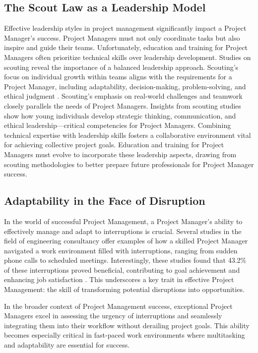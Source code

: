 \documentclass{article}
\begin{document}
\subsection{The Scout Law as a Leadership Model}

Effective leadership styles in project management significantly impact a Project Manager's success. Project Managers must not only coordinate tasks but also inspire and guide their teams. Unfortunately, education and training for Project Managers often prioritize technical skills over leadership development. Studies on scouting reveal the importance of a balanced leadership approach. Scouting's focus on individual growth within teams aligns with the requirements for a Project Manager, including adaptability, decision-making, problem-solving, and ethical judgment \cite{kaluzny2022scouting}. Scouting's emphasis on real-world challenges and teamwork closely parallels the needs of Project Managers. Insights from scouting studies show how young individuals develop strategic thinking, communication, and ethical leadership—critical competencies for Project Managers. Combining technical expertise with leadership skills fosters a collaborative environment vital for achieving collective project goals. Education and training for Project Managers must evolve to incorporate these leadership aspects, drawing from scouting methodologies to better prepare future professionals for Project Manager success.

\subsection{Adaptability in the Face of Disruption}

In the world of successful Project Management, a Project Manager's ability to effectively manage and adapt to interruptions is crucial. Several studies in the field of engineering consultancy offer examples of how a skilled Project Manager navigated a work environment filled with interruptions, ranging from sudden phone calls to scheduled meetings. Interestingly, these studies found that 43.2\% of these interruptions proved beneficial, contributing to goal achievement and enhancing job satisfaction \cite{mordu2016managing}. This underscores a key trait in effective Project Management: the skill of transforming potential disruptions into opportunities.

In the broader context of Project Management success, exceptional Project Managers excel in assessing the urgency of interruptions and seamlessly integrating them into their workflow without derailing project goals. This ability becomes especially critical in fast-paced work environments where multitasking and adaptability are essential for success.
\end{document}
